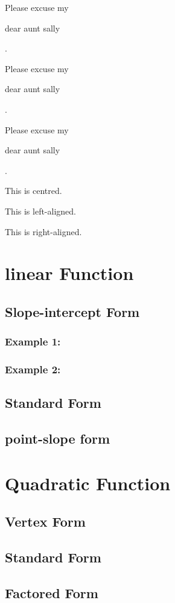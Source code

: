 \documentclass[15pt]{article}                  %
\begin{document}
	Please excuse my \begin{small}
		dear aunt sally
	\end{small}.
	
	Please excuse my \begin{scriptsize}
		dear aunt sally
	\end{scriptsize}.
	
	Please excuse my \begin{tiny}
		dear aunt sally
	\end{tiny}.
	
	\vspace{2cm}
	
	\begin{center}
		This is centred.
	\end{center}
	
	\begin{flushleft}
		This is left-aligned.
	\end{flushleft}
	
	\begin{flushright}
		This is right-aligned.
	\end{flushright}
	
	\vspace{3cm}
	
	\section{linear Function}                      %
	\subsection{Slope-intercept Form}         %
	\subsubsection{Example 1:}            %
	\subsubsection{Example 2:}
	\subsection{Standard Form}
	\subsection{point-slope form}
	
	\section{Quadratic Function}
	\subsection{Vertex Form}
	\subsection{Standard Form}
	\subsection{Factored Form}
	
\end{document}
